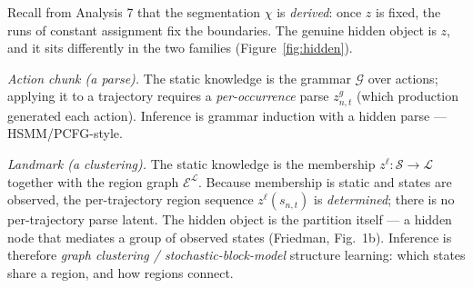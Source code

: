 \documentclass[10pt]{article}
\begin{document}
Recall from Analysis 7 that the segmentation $\chi$ is \emph{derived}: once $z$ is fixed, the
runs of constant assignment fix the boundaries. The genuine hidden object is $z$, and it
sits differently in the two families (Figure~\ref{fig:hidden}).

\emph{Action chunk (a parse).} The static knowledge is the grammar $\mathcal G$ over actions;
applying it to a trajectory requires a \emph{per-occurrence} parse $z^{g}_{n,t}$ (which
production generated each action). Inference is grammar induction with a hidden parse ---
HSMM/PCFG-style.

\emph{Landmark (a clustering).} The static knowledge is the membership $z^{\ell}:\mathcal
S\to\mathcal L$ together with the region graph $\mathcal E^{\mathcal L}$. Because membership is
static and states are observed, the per-trajectory region sequence
$z^{\ell}(s_{n,t})$ is \emph{determined}; there is no per-trajectory parse latent. The hidden
object is the partition itself --- a hidden node that mediates a group of observed states
(Friedman, Fig.~1b). Inference is therefore \emph{graph clustering / stochastic-block-model}
structure learning: which states share a region, and how regions connect.
\end{document}
